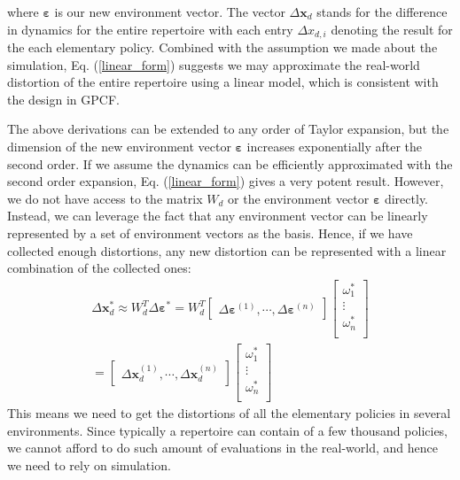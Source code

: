 where $\bm{\varepsilon}$ is our new environment vector. 
The vector $\Delta \bm{x}_d$ stands for the difference in dynamics for the entire repertoire with each entry $\Delta x_{d, i}$ denoting the result for the each elementary policy.
Combined with the assumption we made about the simulation, Eq. (\ref{linear_form}) suggests we may approximate the real-world distortion of the entire repertoire using a linear model, which is consistent with the design in GPCF.


The above derivations can be extended to any order of Taylor expansion, but the dimension of the new environment vector $\bm{\varepsilon}$ increases exponentially after the second order.
If we assume the dynamics can be efficiently approximated with the second order expansion, Eq. (\ref{linear_form}) gives a very potent result.
However, we do not have access to the matrix $W_d$ or the environment vector $\bm{\varepsilon}$ directly. 
Instead, we can leverage the fact that any environment vector can be linearly represented by a set of environment vectors as the basis.
Hence, if we have collected enough distortions, any new distortion can be  represented with a linear combination of the collected ones:
\begin{equation}
\begin{gathered}
\Delta \bm{x}_d^* \approx
W_{d}^T \Delta \bm{\varepsilon}^* = 
W_{d}^T
\begin{bmatrix}
\Delta \bm{\varepsilon}^{(1)}, \cdots, \Delta \bm{\varepsilon}^{(n)}
\end{bmatrix}
\begin{bmatrix}
\omega_1^* \\
\vdots \\
\omega_n^* \\
\end{bmatrix}
\\ =
\begin{bmatrix}
\Delta \bm{x}_d^{(1)}, \cdots, \Delta \bm{x}_d^{(n)}
\end{bmatrix}
\begin{bmatrix}
\omega_1^* \\
\vdots \\
\omega_n^* \\
\end{bmatrix}
\end{gathered}
\label{linear_combination}
\end{equation}
This means we need to get the distortions of all the elementary policies in several environments.
Since typically a repertoire can contain of a few thousand policies,
we cannot afford to do such amount of evaluations in the real-world, and hence we need to rely on simulation.


